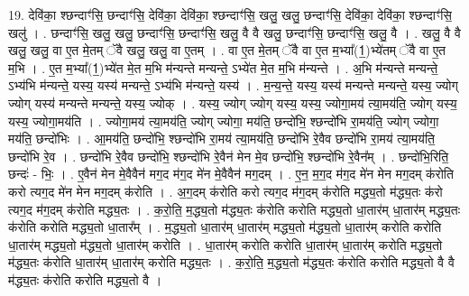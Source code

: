 \documentclass[17pt]{extarticle}
\begin{document}
19. देवि॑का॒ श्छन्दाꣳ॑सि॒ छन्दाꣳ॑सि॒ देवि॑का॒ देवि॑का॒ श्छन्दाꣳ॑सि॒ खलु॒ खलु॒ छन्दाꣳ॑सि॒ देवि॑का॒ देवि॑का॒ श्छन्दाꣳ॑सि॒ खलु॑ । . छन्दाꣳ॑सि॒ खलु॒ खलु॒ छन्दाꣳ॑सि॒ छन्दाꣳ॑सि॒ खलु॒ वै वै खलु॒ छन्दाꣳ॑सि॒ छन्दाꣳ॑सि॒ खलु॒ वै । . खलु॒ वै वै खलु॒ खलु॒ वा ए॒त मे॒तम् ॅवै खलु॒ खलु॒ वा ए॒तम् । . वा ए॒त मे॒तम् ॅवै वा ए॒त म॒भ्या᳚(1॒)भ्ये॑तम् ॅवै वा ए॒त म॒भि । . ए॒त म॒भ्या᳚(1॒)भ्ये॑त मे॒त म॒भि म॑न्यन्ते मन्यन्ते॒ ऽभ्ये॑त मे॒त म॒भि म॑न्यन्ते । . अ॒भि म॑न्यन्ते मन्यन्ते॒ ऽभ्य॑भि म॑न्यन्ते॒ यस्य॒ यस्य॑ मन्यन्ते॒ ऽभ्य॑भि म॑न्यन्ते॒ यस्य॑ । . म॒न्य॒न्ते॒ यस्य॒ यस्य॑ मन्यन्ते मन्यन्ते॒ यस्य॒ ज्योग् ज्योग् यस्य॑ मन्यन्ते मन्यन्ते॒ यस्य॒ ज्योक् । . यस्य॒ ज्योग् ज्योग् यस्य॒ यस्य॒ ज्योगा॒मय॑ त्या॒मय॑ति॒ ज्योग् यस्य॒ यस्य॒ ज्योगा॒मय॑ति । . ज्योगा॒मय॑ त्या॒मय॑ति॒ ज्योग् ज्योगा॒ मय॑ति॒ छन्दो॑भि॒ श्छन्दो॑भि रा॒मय॑ति॒ ज्योग् ज्योगा॒ मय॑ति॒ छन्दो॑भिः । . आ॒मय॑ति॒ छन्दो॑भि॒ श्छन्दो॑भि रा॒मय॑ त्या॒मय॑ति॒ छन्दो॑भि रे॒वैव छन्दो॑भि रा॒मय॑ त्या॒मय॑ति॒ छन्दो॑भि रे॒व । . छन्दो॑भि रे॒वैव छन्दो॑भि॒ श्छन्दो॑भि रे॒वैन॑ मेन मे॒व छन्दो॑भि॒ श्छन्दो॑भि रे॒वैन᳚म् । . छन्दो॑भि॒रिति॒ छन्दः॑ - भिः॒ । . ए॒वैन॑ मेन मे॒वैवैन॑ मग॒द म॑ग॒द मे॑न मे॒वैवैन॑ मग॒दम् । . ए॒न॒ म॒ग॒द म॑ग॒द मे॑न मेन मग॒दम् क॑रोति करो त्यग॒द मे॑न मेन मग॒दम् क॑रोति । . अ॒ग॒दम् क॑रोति करो त्यग॒द म॑ग॒दम् क॑रोति मद्ध्य॒तो म॑द्ध्य॒तः क॑रो त्यग॒द म॑ग॒दम् क॑रोति मद्ध्य॒तः । . क॒रो॒ति॒ म॒द्ध्य॒तो म॑द्ध्य॒तः क॑रोति करोति मद्ध्य॒तो धा॒तार॑म् धा॒तार॑म् मद्ध्य॒तः क॑रोति करोति मद्ध्य॒तो धा॒तार᳚म् । . म॒द्ध्य॒तो धा॒तार॑म् धा॒तार॑म् मद्ध्य॒तो म॑द्ध्य॒तो धा॒तार॑म् करोति करोति धा॒तार॑म् मद्ध्य॒तो म॑द्ध्य॒तो धा॒तार॑म् करोति । . धा॒तार॑म् करोति करोति धा॒तार॑म् धा॒तार॑म् करोति मद्ध्य॒तो म॑द्ध्य॒तः क॑रोति धा॒तार॑म् धा॒तार॑म् करोति मद्ध्य॒तः । . क॒रो॒ति॒ म॒द्ध्य॒तो म॑द्ध्य॒तः क॑रोति करोति मद्ध्य॒तो वै वै म॑द्ध्य॒तः क॑रोति करोति मद्ध्य॒तो वै । \newline
\end{document}
